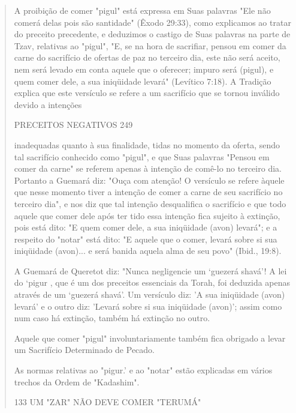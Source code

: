 \begin{quote}
A proibição de comer "pigul" está expressa em Suas palavras "Ele não
comerá delas pois são santidade" (Êxodo 29:33), como explicamos ao
tra­tar do preceito precedente, e deduzimos o castigo de Suas palavras
na parte de Tzav, relativas ao "pigul", "E, se na hora de sacrifiar,
pensou em comer da carne do sacrifício de ofertas de paz no terceiro
dia, este não será aceito, nem será levado em conta aquele que o
oferecer; impuro será (pigul), e quem comer dele, a sua iniqüidade
levará" (Levítico 7:18). A Tradição explica que este versículo se refere
a um sacrifício que se tornou inválido devido a intenções

PRECEITOS NEGATIVOS 249

inadequadas quanto à sua finalidade, tidas no momento da oferta, sendo
tal sa­crifício conhecido como "pigul", e que Suas palavras "Pensou em
comer da carne" se referem apenas à intenção de comê-lo no terceiro dia.
Portanto a Gue­mará diz: "Ouça com atenção! O versículo se refere àquele
que nesse momen­to tiver a intenção de comer a carne de seu sacrifício
no terceiro dia", e nos diz que tal intenção desqualifica o sacrifício e
que todo aquele que comer dele após ter tido essa intenção fica sujeito
à extinção, pois está dito: "E quem co­mer dele, a sua iniqüidade (avon)
levará"; e a respeito do "notar" está dito: "E aquele que o comer,
levará sobre si sua iniqüidade (avon)... e será banida aquela alma de
seu povo" (Ibid., 19:8).

A Guemará de Queretot diz: "Nunca negligencie um `guezerá sha­vá'! A lei
do `pigur , que é um dos preceitos essenciais da Torah, foi deduzida
apenas através de um `guezerá shavá'. Um versículo diz: 'A sua
iniqüidade (avon) levará' e o outro diz: 'Levará sobre si sua iniqüidade
(avon)'; assim como num caso há extinção, também há extinção no outro.

Aquele que comer "pigul" involuntariamente também fica obriga­do a levar
um Sacrifício Determinado de Pecado.

As normas relativas ao "pigur.' e ao "notar" estão explicadas em vá­rios
trechos da Ordem de "Kadashim".

133 UM "ZAR" NÃO DEVE COMER "TERUMÁ"
\end{quote}

